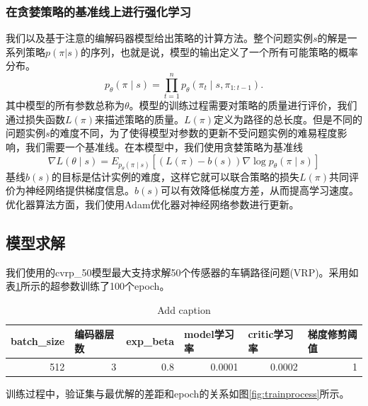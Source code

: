 \documentclass{whutmod}
\begin{document}
\subsubsection{在贪婪策略的基准线上进行强化学习}
我们以及基于注意的编解码器模型给出策略的计算方法。整个问题实例$s$的解是一系列策略$p(\pi|s)$的序列，也就是说，模型的输出定义了一个所有可能策略的概率分布。
\begin{equation}
	p_{\theta}(\pi \mid s)=\prod_{t=1}^{n} p_{ \theta }\left(\pi_{t} \mid s, \pi_{1: t-1}\right).
\end{equation}
其中模型的所有参数总称为$\theta$。模型的训练过程需要对策略的质量进行评价，我们通过损失函数$L(\pi)$来描述策略的质量。$L(\pi)$定义为路径的总长度。但是不同的问题实例$s$的难度不同，为了使得模型对参数的更新不受问题实例的难易程度影响，我们需要一个基准线。在本模型中，我们使用贪婪策略为基准线
\begin{equation}
	\nabla L ( \theta \mid s)= E _{p_{ \theta }( \pi \mid s)}\left[(L( \pi )-b(s)) \nabla \log p_{ \theta }(\pi \mid s)\right]
\end{equation}
基线$b(s)$的目标是估计实例的难度，这样它就可以联合策略的损失$L(\pi)$共同评价为神经网络提供梯度信息。$b(s)$可以有效降低梯度方差，从而提高学习速度。优化器算法方面，我们使用Adam优化器对神经网络参数进行更新。


\subsection{模型求解}
我们使用的cvrp\_50模型最大支持求解50个传感器的车辆路径问题(VRP)。采用如表\ref{tab:hyper_parameter}所示的超参数训练了100个epoch。
\begin{table}[htbp]
	\centering
	\caption{Add caption}
	  \begin{tabular}{rrrrrr}
	  \toprule
	  \multicolumn{1}{l}{batch\_size} & \multicolumn{1}{l}{编码器层数} & \multicolumn{1}{l}{exp\_beta} & \multicolumn{1}{l}{model学习率} & \multicolumn{1}{l}{critic学习率} & \multicolumn{1}{l}{梯度修剪阈值} \\
	  \midrule
	  512   & 3     & 0.8   & 0.0001 & 0.0002 & 1 \\
	  \bottomrule
	  \end{tabular}%
	\label{tab:hyper_parameter}%
  \end{table}%

训练过程中，验证集与最优解的差距和epoch的关系如图\ref{fig:trainprocess}所示。
\end{document}
